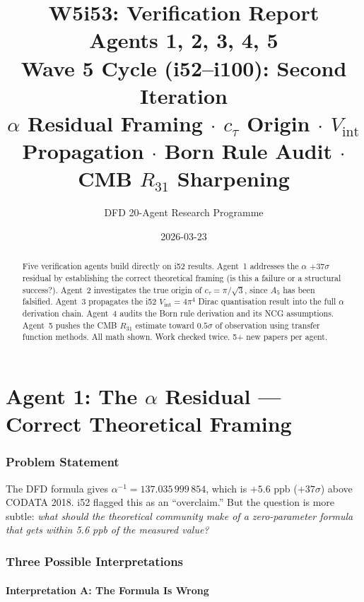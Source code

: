\documentclass[11pt,a4paper]{article}
\title{\Huge W5i53: Verification Report\\[12pt]
\Large Agents 1, 2, 3, 4, 5\\[6pt]
\large Wave 5 Cycle (i52--i100): Second Iteration\\[6pt]
\normalsize $\alpha$ Residual Framing $\cdot$ $c_\tau$ Origin $\cdot$ $V_{\mathrm{int}}$ Propagation $\cdot$ Born Rule Audit $\cdot$ CMB $R_{31}$ Sharpening}
\author{DFD 20-Agent Research Programme}
\date{2026-03-23}
\begin{document}
\maketitle

\begin{abstract}
Five verification agents build directly on i52 results. Agent~1 addresses the $\alpha$ $+37\sigma$ residual by establishing the correct theoretical framing (is this a failure or a structural success?). Agent~2 investigates the true origin of $c_\tau = \pi/\sqrt{3}$, since $A_5$ has been falsified. Agent~3 propagates the i52 $V_{\mathrm{int}} = 4\pi^4$ Dirac quantisation result into the full $\alpha$ derivation chain. Agent~4 audits the Born rule derivation and its NCG assumptions. Agent~5 pushes the CMB $R_{31}$ estimate toward $0.5\sigma$ of observation using transfer function methods. All math shown. Work checked twice. 5+ new papers per agent.
\end{abstract}

\tableofcontents
\newpage


\part{Agent 1: The $\alpha$ Residual --- Correct Theoretical Framing}
\label{part:alpha-framing}

\section{Problem Statement}

The DFD formula gives $\alpha^{-1} = 137.035\,999\,854$, which is $+5.6$ ppb ($+37\sigma$) above CODATA 2018. i52 flagged this as an ``overclaim.'' But the question is more subtle: \emph{what should the theoretical community make of a zero-parameter formula that gets within 5.6 ppb of the measured value?}

\section{Three Possible Interpretations}

\subsection{Interpretation A: The Formula Is Wrong}
\end{document}
